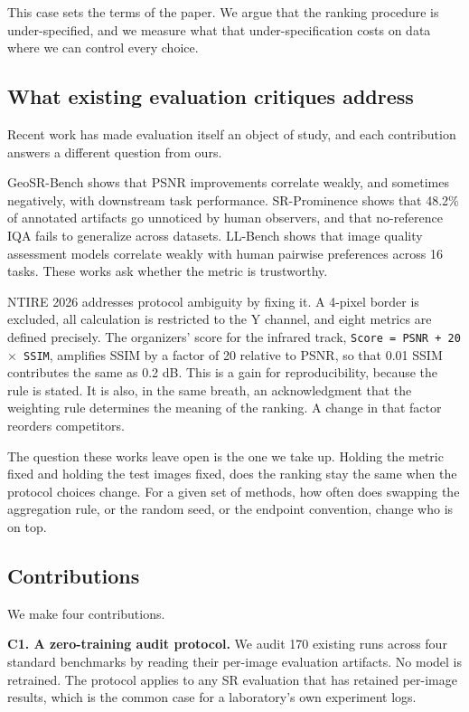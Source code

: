 \documentclass[pdflatex,sn-nature]{sn-jnl}
\begin{document}
This case sets the terms of the paper. We argue that the ranking procedure is under-specified, and we measure what that under-specification costs on data where we can control every choice.

\subsection{What existing evaluation critiques address}\label{sec:prior}

Recent work has made evaluation itself an object of study, and each contribution answers a different question from ours.

GeoSR-Bench shows that PSNR improvements correlate weakly, and sometimes negatively, with downstream task performance. SR-Prominence shows that 48.2\% of annotated artifacts go unnoticed by human observers, and that no-reference IQA fails to generalize across datasets. LL-Bench shows that image quality assessment models correlate weakly with human pairwise preferences across 16 tasks. These works ask whether the metric is trustworthy.

NTIRE 2026 addresses protocol ambiguity by fixing it. A 4-pixel border is excluded, all calculation is restricted to the Y channel, and eight metrics are defined precisely. The organizers' score for the infrared track, \texttt{Score = PSNR + 20 $\times$ SSIM}, amplifies SSIM by a factor of 20 relative to PSNR, so that 0.01 SSIM contributes the same as 0.2 dB. This is a gain for reproducibility, because the rule is stated. It is also, in the same breath, an acknowledgment that the weighting rule determines the meaning of the ranking. A change in that factor reorders competitors.

The question these works leave open is the one we take up. Holding the metric fixed and holding the test images fixed, does the ranking stay the same when the protocol choices change. For a given set of methods, how often does swapping the aggregation rule, or the random seed, or the endpoint convention, change who is on top.

\subsection{Contributions}\label{sec:contributions}

We make four contributions.

\textbf{C1. A zero-training audit protocol.} We audit 170 existing runs across four standard benchmarks by reading their per-image evaluation artifacts. No model is retrained. The protocol applies to any SR evaluation that has retained per-image results, which is the common case for a laboratory's own experiment logs.
\end{document}
